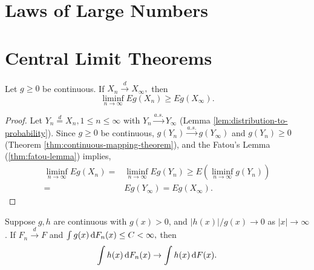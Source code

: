 \section{Laws of Large Numbers}

\section{Central Limit Theorems}

\begin{exercise}
	Let $g\geq 0$ be continuous. If $X_{n}\stackrel{d}{\rightarrow}X_{\infty},$ then
	\begin{equation*}
		\liminf_{n\rightarrow\infty}Eg\left(X_{n}\right)\geq Eg\left(X_{\infty}\right).
	\end{equation*}
	\label{ex:fatou-lemma-distribution}
\end{exercise}

\begin{proof}
	Let $Y_n\stackrel{d}{=}X_n,1\leq n\leq\infty$ with $Y_n\stackrel{a.s.}{\rightarrow}Y_\infty$ (Lemma \ref{lem:distribution-to-probability}).
	Since $g\geq 0$ be continuous, $g(Y_n)\stackrel{a.s.}{\rightarrow}g(Y_\infty)$ and $g(Y_n)\geq 0$ (Theorem \ref{thm:continuous-mapping-theorem}), and the Fatou's Lemma (\ref{thm:fatou-lemma}) implies,
	\begin{equation*}
		\begin{aligned}
			\liminf_{n\rightarrow\infty}Eg(X_n)= & \liminf_{n\rightarrow\infty}Eg(Y_n)\geq E\left(\liminf_{n\rightarrow\infty}g(Y_n)\right) \\
			=                                    & Eg(Y_\infty)=Eg(X_\infty).
		\end{aligned}
	\end{equation*}
\end{proof}

\begin{exercise}
	Suppose $g,h$ are continuous with $g(x)>0$, and $|h(x)|/g(x)\rightarrow 0$ as $|x|\rightarrow\infty$. If $F_{n}\stackrel{d}{\rightarrow}F$ and $\int g(x)\mathop{}\!\mathrm{d} F_{n}(x)\leq C<\infty,$ then
	\begin{equation*}
		\int h(x)\mathop{}\!\mathrm{d} F_{n}(x) \rightarrow \int h(x)\mathop{}\!\mathrm{d} F(x).
	\end{equation*}
\end{exercise}

